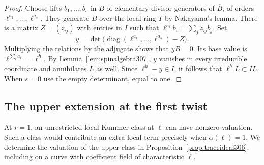 \documentclass[a4paper,11pt]{article}
\theoremstyle{definition}
\theoremstyle{remark}
\numberwithin{equation}{section}
\begin{document}
\begin{proof}
Choose lifts \(b_1,\ldots,b_s\) in \(B\) of elementary-divisor
generators of \(\overline B\), of orders
\(\ell^{a_1},\ldots,\ell^{a_s}\). They generate \(B\) over
the local ring \(T\) by Nakayama's lemma. There is a matrix
\(Z=(z_{ij})\) with entries in \(I\) such that
\(\ell^{a_i} b_i=\sum_j z_{ij}b_j\). Set
\[
             y=\det\bigl(\operatorname{diag}
                                (\ell^{a_1},\ldots,\ell^{a_s})-Z\bigr).
\]
Multiplying the relations by the adjugate shows that \(yB=0\).
Its base value is \(\ell^{\sum_i a_i}=\ell^h\). By
Lemma~\ref{lem:spinalgebra307}, \(y\) vanishes in every
irreducible coordinate and annihilates \(L\) as well. Since
\(\ell^h-y\in I\), it follows that \(\ell^h L\subset IL\).
When \(s=0\) use the empty determinant, equal to one.
\end{proof}

\subsection{The upper extension at the first twist}\label{nav:IV-57}
At \(r=1\), an unrestricted local Kummer class at \(\ell\)
can have nonzero valuation. Such a class would contribute
an extra local term precisely when \(\alpha(\ell)=1\).
We determine the valuation of the upper class in
Proposition~\ref{prop:traceideal306}, including on a curve
with coefficient field of characteristic \(\ell\).
\end{document}
